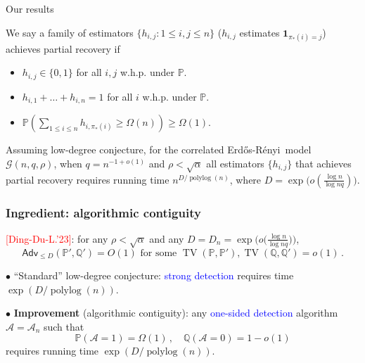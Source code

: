 \documentclass{beamer}
\theoremstyle{plain}
\theoremstyle{definition}
\newcommand{\ER}{Erd\H{o}s-R\'{e}nyi\ }
\newcommand{\Pb}{\mathbb P}
\newcommand{\Qb}{\mathbb Q}
\newcommand{\red}{\textcolor{red}}
\newcommand{\blue}{\textcolor{blue}}
\begin{document}
\begin{frame}{Our results}

We say a family of estimators $\{ h_{i,j}: 1 \leq i,j \leq n \}$ ($h_{i,j}$ estimates $\mathbf 1_{\pi_*(i)=j}$) achieves partial recovery if
\begin{itemize}
    \item $h_{i,j} \in \{ 0,1 \}$ for all $i,j$ w.h.p. under $\Pb$.
    \item $h_{i,1}+\ldots +h_{i,n}=1$ for all $i$ w.h.p. under $\Pb$.
    \item $\Pb( \sum_{1 \leq i \leq n} h_{i,\pi_*(i)} \geq \Omega(n) ) \geq \Omega(1)$.
\end{itemize}

\pause
\begin{theorem}[L.'2025+, informal]
    Assuming low-degree conjecture, for the correlated \ER model $\mathcal G(n,q,\rho)$, when $q=n^{-1+o(1)}$ and $\rho<\sqrt{\alpha}$ all estimators $\{ h_{i,j} \}$ that achieves partial recovery requires running time $n^{D/\operatorname{polylog}(n)}$, where $D=\exp\big( o(\tfrac{\log n}{\log nq}) \big)$. 
\end{theorem}

\end{frame}






\begin{frame}
\frametitle{Ingredient: algorithmic contiguity}

\pause \red{[Ding-Du-L.'23]}: for any $\rho<\sqrt{\alpha}$ and any $D=D_n=\exp\Big( o\big( \tfrac{\log n}{\log nq} \big) \Big)$, 
\begin{equation*}
    \mathsf{Adv}_{\leq D}(\Pb',\Qb')=O(1) \mbox{ for some } \operatorname{TV}(\Pb,\Pb'), \operatorname{TV}(\Qb,\Qb')=o(1) \,.
\end{equation*}

\pause $\bullet$ ``Standard'' low-degree conjecture: \blue{strong detection} requires time $\exp(D/\operatorname{polylog}(n))$.

\medskip

\pause $\bullet$ {\bf Improvement} (algorithmic contiguity): any \blue{one-sided detection} algorithm $\mathcal A=\mathcal A_n$ such that 
\begin{equation*}
    \Pb(\mathcal A=1)=\Omega(1) \,, \quad \Qb(\mathcal A=0)=1-o(1)
\end{equation*}
requires running time $\exp(D/\operatorname{polylog}(n))$.

\end{frame}
\end{document}

